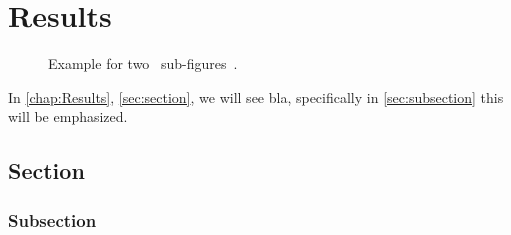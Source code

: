 
\chapter{Results}
\label{chap:Results}


\begin{figure}[t]
  \subfloat[\label{fig:one}]{%
    \exampleDuck[width=0.45\linewidth]%
  }%
  \hfill%
  \subfloat[\label{fig:two}]{%
    \exampleDuck[width=0.45\linewidth]%
  }%
  \caption{Example for two~\protect{} sub-figures~\protect{}.}
\end{figure}

In \autoref{chap:Results}, \autoref{sec:section}, we will see bla, specifically in \autoref{sec:subsection} this will be emphasized. \Blindtext[2]
\section{Section}
\label{sec:section}

\Blindtext[6]
\subsection{Subsection}
\label{sec:subsection}

\Blindtext[3]
